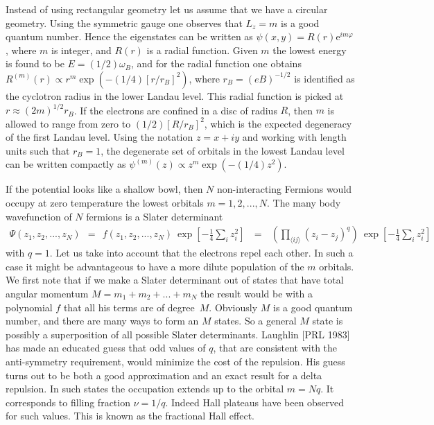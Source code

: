 \documentclass[onecolumn,fleqn, 11pt]{revtex4}
\newcommand{\eexp}{\mathrm{e}^}
\newcommand{\beq}{\begin{eqnarray}}
\newcommand{\eeq}{\end{eqnarray}}
\begin{document}
Instead of using rectangular geometry let us assume that we 
have a circular geometry. Using the symmetric gauge one observes 
that ${L_z=m}$ is a good quantum number. Hence the eigenstates 
can be written as $\psi(x,y) = R(r) \eexp{im\varphi}$, 
where $m$ is integer, and $R(r)$ is a radial function.   
Given $m$ the lowest energy is found to be $E=(1/2)\omega_B$, 
and for the radial function one obtains ${R^{(m)}(r) \propto r^m \exp(-(1/4)[r/r_B]^2)}$,  
where $r_B = (eB)^{-1/2}$ is identified as the cyclotron radius in the lower Landau level.
This radial function is picked at ${r \approx (2m)^{1/2} r_B}$. 
If the electrons are confined in a disc of radius $R$, 
then $m$ is allowed to range from zero to $(1/2)[R/r_B]^2$, 
which is the expected degeneracy of the first Landau level.
Using the notation ${z=x+iy}$ and working with length units
such that ${r_B=1}$, the degenerate set of orbitals in the 
lowest Landau level can be written compactly 
as ${\psi^{(m)}(z) \propto z^m \exp(-(1/4)z^2)}$.
   

If the potential looks like a shallow bowl, then $N$ non-interacting 
Fermions would occupy at zero temperature the lowest orbitals ${m=1,2,...,N}$.    
The many body wavefunction of $N$ fermions is a Slater determinant  
\beq
\Psi(z_1,z_2,...,z_N)
\ \ = \ \ f(z_1,z_2,...,z_N) \ \exp\left[- \frac{1}{4}\sum_i z_i^2 \right]  
\ \ \ = \ \ \ \left( \prod_{\langle ij \rangle} (z_i-z_j)^q \right) \ \exp\left[- \frac{1}{4}\sum_i z_i^2 \right]  
\eeq
with $q=1$. Let us take into account that the electrons repel each other.
In such a case it might be advantageous to have a more dilute population 
of the $m$ orbitals. We first note that if we make a Slater determinant 
out of states that have total angular momentum ${M=m_1+m_2+...+m_N}$ the 
result would be with a polynomial $f$ that all his terms are of degree~$M$. 
Obviously $M$ is a good quantum number, and there are many ways to form 
an $M$ states. So a general $M$ state is possibly a superposition 
of all possible Slater determinants. Laughlin [PRL 1983] has made an 
educated guess that odd values of $q$, that are consistent with the 
anti-symmetry requirement,  would minimize the cost of the repulsion. 
His guess turns out to be both a good approximation and an exact result 
for a delta repulsion. In such states the occupation extends up to 
the orbital ${m=Nq}$. It corresponds to filling fraction ${\nu=1/q}$.
Indeed Hall plateaus have been observed for such values. This is known 
as the fractional Hall effect.  
\end{document}
